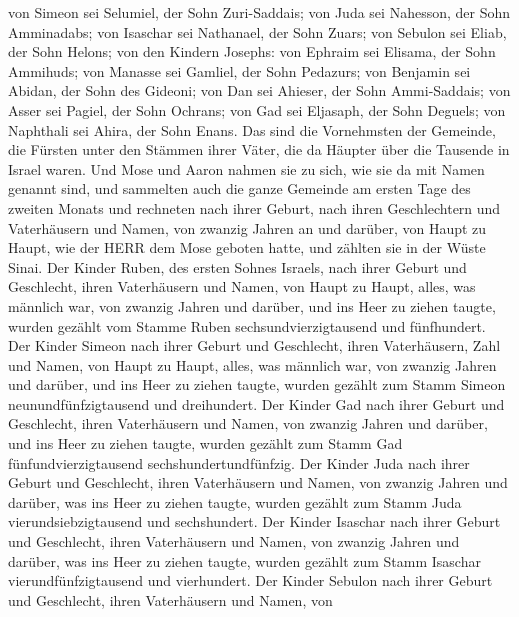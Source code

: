  von Simeon sei Selumiel, der Sohn Zuri-Saddais;
 von Juda sei Nahesson, der Sohn Amminadabs; 
von Isaschar sei Nathanael, der Sohn Zuars;  von Sebulon sei
Eliab, der Sohn Helons;  von den Kindern Josephs: von
Ephraim sei Elisama, der Sohn Ammihuds; von Manasse sei Gamliel, der
Sohn Pedazurs;  von Benjamin sei Abidan, der Sohn des
Gideoni;  von Dan sei Ahieser, der Sohn Ammi-Saddais;
 von Asser sei Pagiel, der Sohn Ochrans;  von
Gad sei Eljasaph, der Sohn Deguels;  von Naphthali sei
Ahira, der Sohn Enans.  Das sind die Vornehmsten der
Gemeinde, die Fürsten unter den Stämmen ihrer Väter, die da Häupter über
die Tausende in Israel waren.  Und Mose und Aaron nahmen
sie zu sich, wie sie da mit Namen genannt sind,  und
sammelten auch die ganze Gemeinde am ersten Tage des zweiten Monats und
rechneten nach ihrer Geburt, nach ihren Geschlechtern und Vaterhäusern
und Namen, von zwanzig Jahren an und darüber, von Haupt zu Haupt,
 wie der HERR dem Mose geboten hatte, und zählten sie in
der Wüste Sinai.  Der Kinder Ruben, des ersten Sohnes
Israels, nach ihrer Geburt und Geschlecht, ihren Vaterhäusern und Namen,
von Haupt zu Haupt, alles, was männlich war, von zwanzig Jahren und
darüber, und ins Heer zu ziehen taugte,  wurden gezählt vom
Stamme Ruben sechsundvierzigtausend und fünfhundert.  Der
Kinder Simeon nach ihrer Geburt und Geschlecht, ihren Vaterhäusern, Zahl
und Namen, von Haupt zu Haupt, alles, was männlich war, von zwanzig
Jahren und darüber, und ins Heer zu ziehen taugte,  wurden
gezählt zum Stamm Simeon neunundfünfzigtausend und dreihundert.
 Der Kinder Gad nach ihrer Geburt und Geschlecht, ihren
Vaterhäusern und Namen, von zwanzig Jahren und darüber, und ins Heer zu
ziehen taugte,  wurden gezählt zum Stamm Gad
fünfundvierzigtausend sechshundertundfünfzig.  Der Kinder
Juda nach ihrer Geburt und Geschlecht, ihren Vaterhäusern und Namen, von
zwanzig Jahren und darüber, was ins Heer zu ziehen taugte, 
wurden gezählt zum Stamm Juda vierundsiebzigtausend und sechshundert.
 Der Kinder Isaschar nach ihrer Geburt und Geschlecht,
ihren Vaterhäusern und Namen, von zwanzig Jahren und darüber, was ins
Heer zu ziehen taugte,  wurden gezählt zum Stamm Isaschar
vierundfünfzigtausend und vierhundert.  Der Kinder Sebulon
nach ihrer Geburt und Geschlecht, ihren Vaterhäusern und Namen, von
